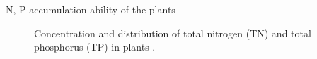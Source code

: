 \begin{frame}{N, P accumulation ability of the plants}
\begin{figure}
	\centering
	\begin{columns}[T]
\end{columns}
\caption{Concentration and distribution of total nitrogen (TN) and total phosphorus (TP) in plants \cite{yu2014biomass}.}

\end{figure}
\end{frame}

